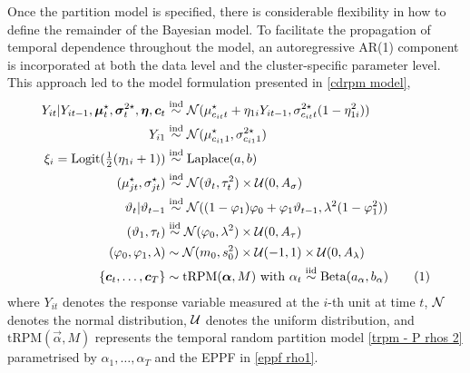 \documentclass[12pt,	%
	a4paper,		%
	twoside,		%
	openright,		%
	titlepage,%
	]{book}
\newcommand\numberthis{\addtocounter{equation}{1}\tag{\theequation}}
\theoremstyle{definition}
\let\cite\citep
\begin{document}
Once the partition model is specified, there is considerable flexibility in how to define the remainder of the Bayesian model. To facilitate the propagation of temporal dependence throughout the model, an autoregressive AR(1) component is incorporated at both the data level and the cluster-specific parameter level. This approach led \cite{1-drpm} to the model formulation presented in \eqref{cdrpm model}, 
\begin{align*}
Y_{it}|Y_{it-1},\vec{\mu}^{\star}_t,\vec{\sigma}^{2\star}_t, \vec{\eta},\vec{c}_t &\simind \mathcal{N}(\mu_{c_{it}t}^\star+\eta_{1i}Y_{it-1},\sigma^{2\star}_{c_{it}t}(1-\eta_{1i}^2))  \\
Y_{i1} &\simind \mathcal{N}(\mu^\star_{c_{i1}1},\sigma^{2\star}_{c_{i1}1})\\
%
\xi_i = \text{Logit$(\tfrac{1}{2}(\eta_{1i}+1)$}) &\simind \text{Laplace$(a,b)$}\\
%
( \mu_{jt}^\star, \sigma_{jt}^\star) &\simind \N(\theta_t,\tau_t^2) \times \U(0,A_\sigma)\\
%
\theta_t | \theta_{t-1} &\simind \N((1-\phi_1)\phi_0 + \phi_1\theta_{t-1},\lambda^2(1-\phi_1^2))\\
%
(\theta_1,\tau_t) &\simiid \N(\phi_0,\lambda^2) \times \U(0,A_\tau)\\
%
(\phi_0,\phi_1,\lambda) &\sim \N(m_0,s_0^2) \times \U(-1,1) \times \U(0,A_\lambda)\\
%
\{\vec{c}_t, \ldots, \vec{c}_T\} &\sim \text{tRPM}(\vec{\alpha}, M) \text{ with } \alpha_t \simiid \text{Beta}(a_\alpha, b_\alpha)
 \numberthis \label{cdrpm model}
\end{align*}
where $Y_{it}$ denotes the response variable measured at the $i$-th unit at time $t$, $\mathcal{N}$ denotes the normal distribution, $\mathcal{U}$ denotes the uniform distribution, and $\text{tRPM}(\vec{\alpha}, M)$ represents the temporal random partition model \eqref{trpm - P rhos 2} parametrised by $\alpha_1, \ldots, \alpha_T$ and the EPPF in \eqref{eppf rho1}. 
\end{document}
